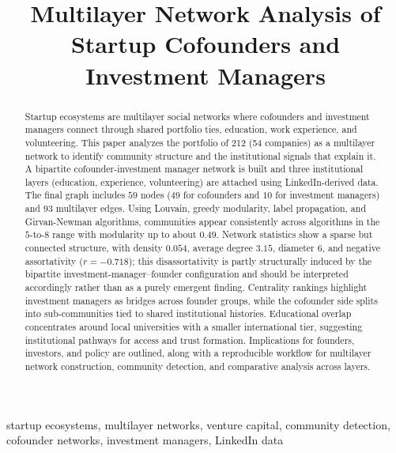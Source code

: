 \documentclass[conference]{IEEEtran}
\begin{document}
\title{Multilayer Network Analysis of Startup Cofounders and Investment Managers}

\author{
}

\maketitle

\begin{abstract}
Startup ecosystems are multilayer social networks where cofounders and investment managers connect through shared portfolio ties, education, work experience, and volunteering. This paper analyzes the portfolio of 212 (54 companies) as a multilayer network to identify community structure and the institutional signals that explain it. A bipartite cofounder-investment manager network is built and three institutional layers (education, experience, volunteering) are attached using LinkedIn-derived data. The final graph includes $59$ nodes ($49$ for cofounders and $10$ for investment managers) and $93$ multilayer edges. Using Louvain, greedy modularity, label propagation, and Girvan-Newman algorithms, communities appear consistently across algorithms in the $5$-to-$8$ range with modularity up to about $0.49$. Network statistics show a sparse but connected structure, with density $0.054$, average degree $3.15$, diameter $6$, and negative assortativity ($r=-0.718$); this disassortativity is partly structurally induced by the bipartite investment-manager–founder configuration and should be interpreted accordingly rather than as a purely emergent finding. Centrality rankings highlight investment managers as bridges across founder groups, while the cofounder side splits into sub-communities tied to shared institutional histories. Educational overlap concentrates around local universities with a smaller international tier, suggesting institutional pathways for access and trust formation. Implications for founders, investors, and policy are outlined, along with a reproducible workflow for multilayer network construction, community detection, and comparative analysis across layers.
\end{abstract}

\begin{IEEEkeywords}
startup ecosystems, multilayer networks, venture capital, community detection, cofounder networks, investment managers, LinkedIn data
\end{IEEEkeywords}
\end{document}
